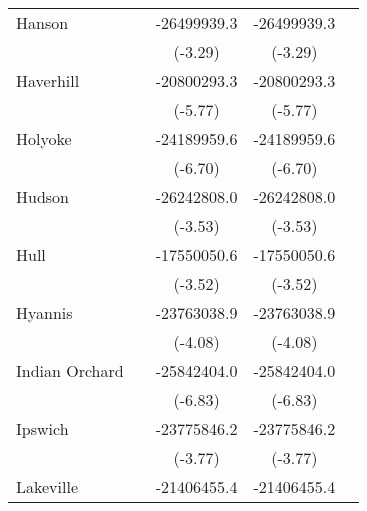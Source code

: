 {\begin{tabular}{l*{4}{c}}
\addlinespace
Hanson              &                     & -26499939.3\sym{***}& -26499939.3\sym{***}&                     \\
                    &                     &     (-3.29)         &     (-3.29)         &                     \\
\addlinespace
Haverhill           &                     & -20800293.3\sym{***}& -20800293.3\sym{***}&                     \\
                    &                     &     (-5.77)         &     (-5.77)         &                     \\
\addlinespace
Holyoke             &                     & -24189959.6\sym{***}& -24189959.6\sym{***}&                     \\
                    &                     &     (-6.70)         &     (-6.70)         &                     \\
\addlinespace
Hudson              &                     & -26242808.0\sym{***}& -26242808.0\sym{***}&                     \\
                    &                     &     (-3.53)         &     (-3.53)         &                     \\
\addlinespace
Hull                &                     & -17550050.6\sym{***}& -17550050.6\sym{***}&                     \\
                    &                     &     (-3.52)         &     (-3.52)         &                     \\
\addlinespace
Hyannis             &                     & -23763038.9\sym{***}& -23763038.9\sym{***}&                     \\
                    &                     &     (-4.08)         &     (-4.08)         &                     \\
\addlinespace
Indian Orchard      &                     & -25842404.0\sym{***}& -25842404.0\sym{***}&                     \\
                    &                     &     (-6.83)         &     (-6.83)         &                     \\
\addlinespace
Ipswich             &                     & -23775846.2\sym{***}& -23775846.2\sym{***}&                     \\
                    &                     &     (-3.77)         &     (-3.77)         &                     \\
\addlinespace
Lakeville           &                     & -21406455.4\sym{***}& -21406455.4\sym{***}&                     \\

\end{tabular}}
